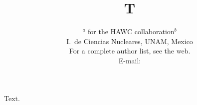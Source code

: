 \documentclass{PoS}
\title{T}
\author{\speaker{Lukas Nellen}$^a$ for the HAWC collaboration$^b$\\
    \llap{$^a$}I.\ de Ciencias Nucleares, UNAM, Mexico\\
    \llap{$^b$}For a complete author list, see the web.\\
    E-mail: \email{lukas@nucleares.unam.mx}}
\begin{document}
\maketitle
Text.
\end{document}
